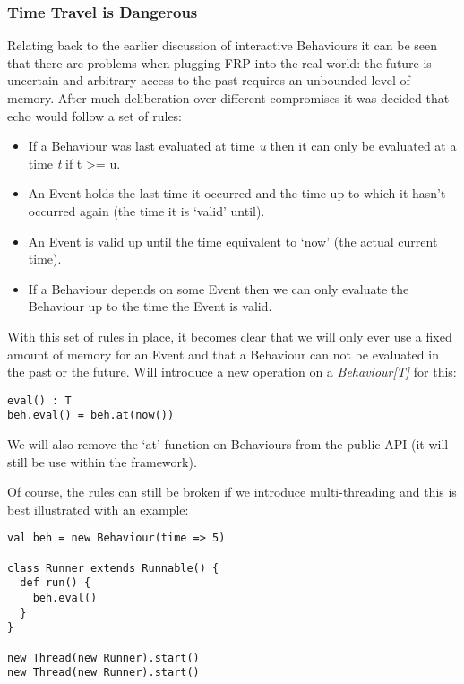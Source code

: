 \documentclass[12pt]{article}
\begin{document}
      \subsubsection{Time Travel is Dangerous}
        Relating back to the earlier discussion of interactive Behaviours it can be seen
        that there are problems when plugging FRP into the real world: the future is uncertain and
        arbitrary access to the past requires an unbounded level of memory. After much deliberation
        over different compromises it was decided that echo would follow a set of rules:
        
        \begin{itemize}
          \item If a Behaviour was last evaluated at time \emph{u} then it can only be evaluated at
          a time \emph{t} if t >= u.
          \item An Event holds the last time it occurred and the time up to which it hasn't occurred
          again (the time it is `valid' until).
          \item An Event is valid up until the time equivalent to `now' (the actual current time).
          \item If a Behaviour depends on some Event then we can only evaluate the Behaviour up to
          the time the Event is valid.
        \end{itemize}
        
        With this set of rules in place, it becomes clear that we will only ever use a fixed amount of memory
        for an Event and that a Behaviour can not be evaluated in the past or the future. Will
        introduce a new operation on a \emph{Behaviour[T]} for this:

\begin{verbatim}
eval() : T
beh.eval() = beh.at(now())
\end{verbatim}       

        We will also remove the `at' function on Behaviours from the public API (it will still be
        use within the framework). 
        
        Of course, the rules can still be broken if we introduce multi-threading and this is best illustrated
        with an example:
        
\begin{verbatim}
val beh = new Behaviour(time => 5)

class Runner extends Runnable() {
  def run() {
    beh.eval()
  }
}

new Thread(new Runner).start()
new Thread(new Runner).start()
\end{verbatim}       
\end{document}
